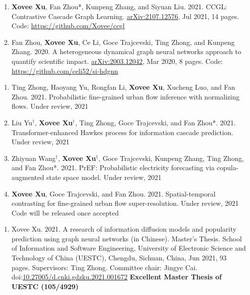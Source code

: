 
\begin{enumerate}[resume]
    \item \textbf{Xovee Xu}, Fan Zhou*, Kunpeng Zhang, and Siyuan Liu. 2021. CCGL: Contrastive Cascade Graph Learning. \href{https://arxiv.org/abs/2107.12576}{arXiv:2107.12576}, Jul 2021, 14 pages. \newline Code: {\color{gray}\url{https://github.com/Xovee/ccgl}}
    \item Fan Zhou, \textbf{Xovee Xu}, Ce Li, Goce Trajcevski, Ting Zhong, and Kunpeng Zhang. 2020. A heterogeneous dynamical graph neural networks approach to quantify scientific impact. \href{https://arxiv.org/abs/2003.12042}{arXiv:2003.12042}, Mar 2020, 8 pages. \newline Code: {\color{gray}\url{https://github.com/celi52/si-hdgnn}}
\end{enumerate}


\begin{enumerate}[resume]
    \item Ting Zhong, Haoyang Yu, Rongfan Li, \textbf{Xovee Xu}, Xucheng Luo, and Fan Zhou. 2021. Probabilistic fine-grained urban flow inference with normalizing flows. Under review, 2021
    \item Liu Yu$^\dagger$, \textbf{Xovee Xu}$^\dagger$, Ting Zhong, Goce Trajcevski, and Fan Zhou*. 2021. Transformer-enhanced Hawkes process for information cascade prediction. Under review, 2021
    \item Zhiyuan Wang$^\dagger$, \textbf{Xovee Xu}$^\dagger$, Goce Trajcevski, Kunpeng Zhang, Ting Zhong, and Fan Zhou*. 2021. PrEF: Probabilistic electricity forecasting via copula-augmented state space model. Under review, 2021 
    \item \textbf{Xovee Xu}, Goce Trajcevski, and Fan Zhou. 2021. Spatial-temporal contrasting for fine-grained urban flow super-resolution. Under review, 2021 \newline Code will be released once accepted
\end{enumerate}


\begin{enumerate}
    \item Xovee Xu. 2021. A research of information diffusion models and popularity prediction using graph neural networks (in Chinese). Master's Thesis. School of Information and Software Engineering, University of Electronic Science and Technology of China (UESTC), Chengdu, Sichuan, China, Jun 2021, 93 pages. Supervisors: Ting Zhong. Committee chair: Jingye Cai. doi:\href{https://doi.org/10.27005/d.cnki.gdzku.2021.001672}{10.27005/d.cnki.gdzku.2021.001672}\newline
    \textbf{\color{red}Excellent Master Thesis of UESTC (105/4929)}
\end{enumerate}


